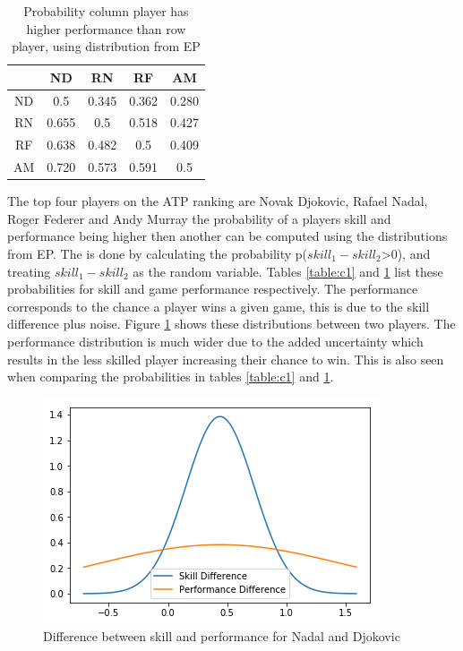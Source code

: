 \documentclass[twoside,twocolumn]{article}
\begin{document}
\begin{table}[h]
\centering
\begin{tabular}{ c | c  c  c  c}
&ND&RN&RF&AM\\ 

\midrule
ND&0.5  &   0.345 & 0.362 &0.280\\
RN&0.655&0.5&0.518&0.427\\
RF&0.638&0.482&0.5&0.409 \\
AM&0.720&0.573&0.591&0.5\\
\end{tabular}
\caption{Probability column player has higher performance than row player, using distribution from EP}
\label{table:c2}
\end{table}

The top four players on the ATP ranking are Novak Djokovic, Rafael Nadal, Roger Federer and Andy Murray the probability of a players skill and performance being higher then another can be computed using the distributions from EP. The is done by calculating the probability p($skill_1-skill_2$>0), and treating $skill_1-skill_2$ as the random variable. Tables \ref{table:c1} and \ref{table:c2} list these probabilities for skill and game performance respectively. The performance corresponds to the chance a player wins a given game, this is due to the skill difference plus noise. Figure \ref{fig:c_1} shows these distributions between two players. The performance distribution is much wider due to the added uncertainty which results in the less skilled player increasing their chance to win. This is also seen when comparing the probabilities in tables \ref{table:c1} and \ref{table:c2}.

\begin{figure}[h]
  \centering
    \includegraphics[width=\linewidth]{c_1}
  \caption{Difference between skill and performance for Nadal and Djokovic}
  \label{fig:c_1}
\end{figure}
\end{document}
